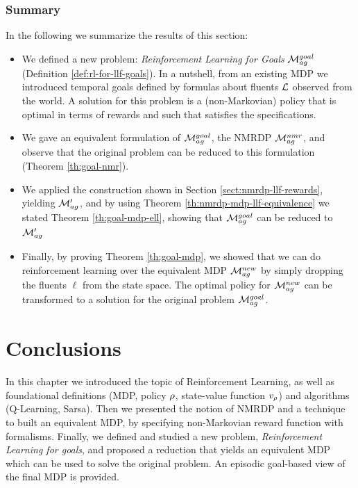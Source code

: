 \subsubsection{Summary}
In the following we summarize the results of this section:
\begin{itemize}
	\item We defined a new problem: \emph{Reinforcement Learning for \LLf Goals} $\mathcal{M}_{ag}^{goal}$ (Definition \ref{def:rl-for-llf-goals}). In a nutshell, from an existing MDP we introduced temporal goals defined by \LLf formulas about fluents $\mathcal{L}$ observed from the world. A solution for this problem is a (non-Markovian) policy that is optimal in terms of rewards and such that satisfies the \LLf specifications.
	\item We gave an equivalent formulation of $\mathcal{M}_{ag}^{goal}$, the NMRDP $\mathcal{M}_{ag}^{nmr}$, and observe that the original problem can be reduced to this formulation (Theorem \ref{th:goal-nmr}).
	\item We applied the construction shown in Section \ref{sect:nmrdp-llf-rewards}, yielding $\mathcal{M}'_{ag}$, and by using Theorem \ref{th:nmrdp-mdp-llf-equivalence} we stated Theorem \ref{th:goal-mdp-ell}, showing that $\mathcal{M}_{ag}^{goal}$ can be reduced to $\mathcal{M}'_{ag}$
	\item Finally, by proving Theorem \ref{th:goal-mdp}, we showed that we can do reinforcement learning over the equivalent MDP $\mathcal{M}_{ag}^{new}$ by simply dropping the fluents $\ell$ from the state space. The optimal policy for $\mathcal{M}_{ag}^{new}$ can be transformed to a solution for the original problem $\mathcal{M}_{ag}^{goal}$.
\end{itemize}

\section{Conclusions}
In this chapter we introduced the topic of Reinforcement Learning, as well as foundational definitions (MDP, policy $\rho$, state-value function $v_\rho$) and algorithms (Q-Learning, Sarsa). Then we presented the notion of NMRDP and a technique to built an equivalent MDP, by specifying non-Markovian reward function with \LLf formalisms.
Finally, we defined and studied a new problem, \emph{Reinforcement Learning for \LLf goals}, and proposed a reduction that yields an equivalent MDP which can be used to solve the original problem. An episodic goal-based view of the final MDP is provided.
\endinput


















